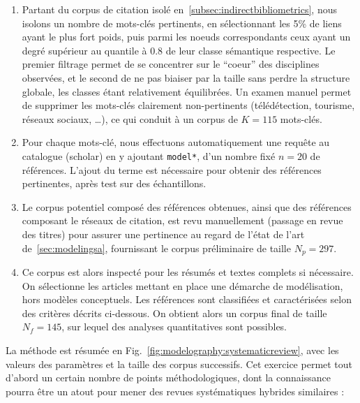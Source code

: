 \begin{enumerate}
\item Partant du corpus de citation isolé en~\ref{subsec:indirectbibliometrics}, nous isolons un nombre de mots-clés pertinents, en sélectionnant les 5\%  de liens ayant le plus fort poids, puis parmi les noeuds correspondants ceux ayant un degré supérieur au quantile à 0.8 de leur classe sémantique respective. Le premier filtrage permet de se concentrer sur le ``coeur'' des disciplines observées, et le second de ne pas biaiser par la taille sans perdre la structure globale, les classes étant relativement équilibrées. Un examen manuel permet de supprimer les mots-clés clairement non-pertinents (télédétection, tourisme, réseaux sociaux, \ldots), ce qui conduit à un corpus de $K=115$ mots-clés.
\item Pour chaque mots-clé, nous effectuons automatiquement une requête au catalogue (scholar) en y ajoutant \texttt{model*}, d'un nombre fixé $n=20$ de références. L'ajout du terme est nécessaire pour obtenir des références pertinentes, après test sur des échantillons.
\item Le corpus potentiel composé des références obtenues, ainsi que des références composant le réseaux de citation, est revu manuellement (passage en revue des titres) pour assurer une pertinence au regard de l'état de l'art de~\ref{sec:modelingsa}, fournissant le corpus préliminaire de taille $N_p = 297$.
\item Ce corpus est alors inspecté pour les résumés et textes complets si nécessaire. On sélectionne les articles mettant en place une démarche de modélisation, hors modèles conceptuels. Les références sont classifiées et caractérisées selon des critères décrits ci-dessous. On obtient alors un corpus final de taille $N_f = 145$, sur lequel des analyses quantitatives sont possibles.
\end{enumerate}

La méthode est résumée en Fig.~\ref{fig:modelography:systematicreview}, avec les valeurs des paramètres et la taille des corpus successifs. Cet exercice permet tout d'abord un certain nombre de points méthodologiques, dont la connaissance pourra être un atout pour mener des revues systématiques hybrides similaires :

